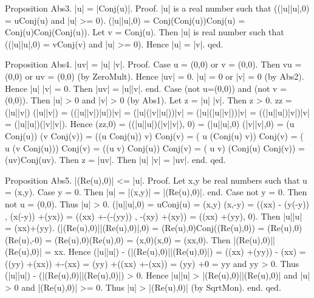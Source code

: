 \documentclass{article}
\newenvironment{forthel}{\begin{leftbar}}{\end{leftbar}}
\newcommand{\cmul}{\cdot}
\newcommand{\rmul}{\cdot}
\newcommand{\radd}{+}
\begin{document}
\begin{forthel}
Proposition Abs3. |u| = |Conj(u)|.
Proof. 	|u| is a real number such that ((|u|\rmul |u|,0) = u\cmul Conj(u) and |u| >= 0). 
		(|u|\rmul |u|,0) = Conj(Conj(u))\cmul Conj(u) = Conj(u)\cmul Conj(Conj(u)).
		Let v = Conj(u). Then |u| is real number such that ((|u|\rmul |u|,0) = v\cmul Conj(v) and |u| >= 0). 
		Hence |u| = |v|.
qed.

Proposition Abs4. |u\cmul v| = |u| \rmul  |v|.
Proof. 	Case u = (0,0) or v = (0,0). Then v\cmul u = (0,0) or u\cmul v = (0,0) (by ZeroMult). Hence |u\cmul v| = 0.
									|u| = 0 or |v| = 0 (by Abs2). Hence |u| \rmul  |v| = 0.
									Then  |u\cmul v| = |u|\rmul |v|. end.
		Case (not u=(0,0)) and (not v = (0,0)). Then |u| > 0 and |v| > 0 (by Abs1). Let z = |u| \rmul  |v|. Then z > 0.
												z\rmul z = (|u|\rmul |v|) \rmul  (|u|\rmul |v|) = ((|u|\rmul |v|)\rmul |u|)\rmul |v| = (|u|\rmul (|v|\rmul |u|))\rmul |v|
													= (|u|\rmul (|u|\rmul |v|))\rmul |v| = ((|u|\rmul |u|)\rmul |v|)\rmul |v| = (|u|\rmul |u|)\rmul (|v|\rmul |v|).
												Hence (z\rmul z,0)	= ((|u|\rmul |u|)\rmul (|v|\rmul |v|), 0) = (|u|\rmul |u|,0) \cmul  (|v|\rmul |v|,0)
																= (u  \cmul   Conj(u)) \cmul  (v   \cmul  Conj(v)) 
																= ((u \cmul   Conj(u)) \cmul   v)  \cmul  Conj(v) 
									       	 	   				= ( u \cmul  (Conj(u)  \cmul   v)) \cmul  Conj(v) 
									       	    				= ( u \cmul  (v  \cmul   Conj(u))) \cmul  Conj(v) 
									      						= ((u \cmul   v) \cmul   Conj(u))  \cmul  Conj(v) 
									      						= ( u \cmul   v) \cmul   (Conj(u)   \cmul  Conj(v)) = (u\cmul v)\cmul Conj(u\cmul v).
									      		Then z = |u\cmul v|. Then |u| \rmul  |v| = |u\cmul v|. end.
qed.

Proposition Abs5. |(Re(u),0)| <= |u|.
Proof. 	Let x,y be real numbers such that u = (x,y). 
		Case y = 0. Then |u| = |(x,y)| = |(Re(u),0)|. end.
		Case not y = 0. Then not u = (0,0). Thus |u| > 0.
 						(|u|\rmul |u|,0) = u\cmul Conj(u) = (x,y) \cmul  (x,-y) = ((x\rmul x) - (y\rmul (-y)) , (x\rmul (-y)) \radd  (y\rmul x)) = ((x\rmul x) \radd  -(-(y\rmul y)) , -(x\rmul y) \radd  (x\rmul y)) 
									= ((x\rmul x) \radd  (y\rmul y), 0). Then |u|\rmul |u| = (x\rmul x)\radd (y\rmul y).
						(|(Re(u),0)|\rmul |(Re(u),0)|,0) = (Re(u),0)\cmul Conj((Re(u),0)) = (Re(u),0)\cmul (Re(u),-0) = (Re(u),0)\cmul (Re(u),0) = (x,0)\cmul (x,0) = (x\rmul x,0).
						Then |(Re(u),0)|\rmul |(Re(u),0)| = x\rmul x.
						Hence (|u|\rmul |u|) -  (|(Re(u),0)|\rmul |(Re(u),0)|) = ((x\rmul x) \radd  (y\rmul y)) - (x\rmul x) = ((y\rmul y) \radd  (x\rmul x)) \radd  -(x\rmul x) = (y\rmul y) \radd  ((x\rmul x) \radd  -(x\rmul x)) = (y\rmul y) \radd  0 = y\rmul y and y\rmul y > 0.
						Thus (|u|\rmul |u|) -  (|(Re(u),0)|\rmul |(Re(u),0)|) > 0.
						Hence |u|\rmul |u| > |(Re(u),0)|\rmul |(Re(u),0)| and |u| > 0 and |(Re(u),0)| >= 0.
						Thus  |u| > |(Re(u),0)| (by SqrtMon).
		end.
qed.


\end{forthel}
\end{document}
